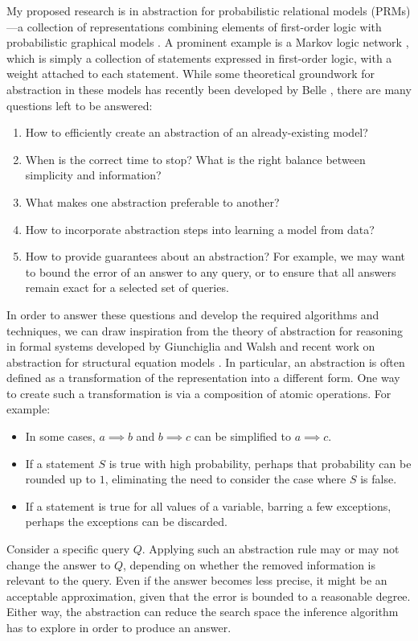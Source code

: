\documentclass{article}
\begin{document}
My proposed research is in abstraction for probabilistic relational models
(PRMs)---a collection of representations combining elements of
first-order logic with probabilistic graphical models
\cite{getoor2007introduction, heckerman2004probabilistic}. A prominent example
is a Markov logic network \cite{DBLP:journals/ml/RichardsonD06}, which is
simply a collection of statements expressed in first-order logic, with a weight
attached to each statement. While some theoretical groundwork for abstraction in
these models has recently been developed by Belle \cite{belle2018abstracting},
there are many questions left to be answered:
\begin{enumerate}
\item How to efficiently create an abstraction of an already-existing
  model? \label{q:1}
\item When is the correct time to stop? What is the right balance between
  simplicity and information? \label{q:2}
\item What makes one abstraction preferable to another? \label{q:3}
\item How to incorporate abstraction steps into learning a model from
  data? \label{q:4}
\item How to provide guarantees about an abstraction? For example, we may want
  to bound the error of an answer to any query, or to ensure that all answers
  remain exact for a selected set of queries. \label{q:5}
\end{enumerate}

In order to answer these questions and develop the required algorithms and
techniques, we can draw inspiration from the theory of abstraction for reasoning
in formal systems developed by Giunchiglia and Walsh
\cite{DBLP:journals/ai/GiunchigliaW92} and recent work on abstraction for
structural equation models \cite{DBLP:conf/uai/RubensteinWBMJG17}. In
particular, an abstraction is often defined as a transformation of the
representation into a different form. One way to create such a transformation is
via a composition of atomic operations. For example:
\begin{itemize}
\item In some cases, $a \implies b$ and $b \implies c$ can be simplified to $a
  \implies c$.
\item If a statement $S$ is true with high probability, perhaps that probability
  can be rounded up to $1$, eliminating the need to consider the case where $S$
  is false.
\item If a statement is true for all values of a variable, barring a few
  exceptions, perhaps the exceptions can be discarded.
\end{itemize}
Consider a specific query $Q$. Applying such an abstraction rule may or may not
change the answer to $Q$, depending on whether the removed information
is relevant to the query. Even if the answer becomes less precise, it might be
an acceptable approximation, given that the error is bounded to a reasonable
degree. Either way, the abstraction can reduce the search space the inference
algorithm has to explore in order to produce an answer.
\end{document}
